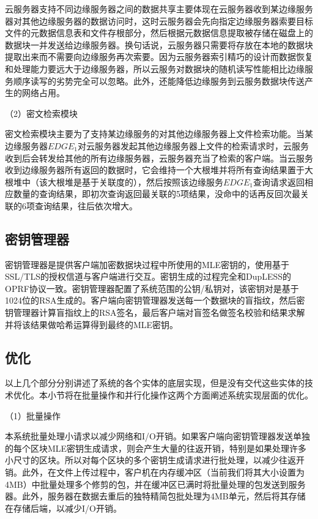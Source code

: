 \documentclass[promaster]{thesis-uestc}
\begin{document}
云服务器支持不同边缘服务器之间的数据共享主要体现在云服务器收到某边缘服务器对其他边缘服务器的数据访问时，这时云服务器会先向指定边缘服务器索要目标文件的元数据信息表和文件存根部分，然后根据元数据信息提取被存储在磁盘上的数据块一并发送给边缘服务器。换句话说，云服务器只需要将存放在本地的数据块提取出来而不需要向边缘服务再次索要。因为云服务器索引精巧的设计而数据恢复和处理能力要远大于边缘服务器，所以云服务对数据块的随机读写性能相比边缘服务顺序读写的劣势完全可以忽略。此外，还能降低边缘服务到云服务数据块传送产生的网络占用。

（2）密文检索模块

密文检索模块主要为了支持某边缘服务的对其他边缘服务器上文件检索功能。当某边缘服务器$EDGE_1$对云服务器发起其他边缘服务器上文件的检索请求时，云服务收到后会转发给其他的所有边缘服务器，云服务器充当了检索的客户端。当云服务收到边缘服务器所有返回的数据时，它会维持一个大根堆并将所有查询结果置于大根堆中（该大根堆是基于关联度的），然后按照该边缘服务$EDGE_1$查询请求返回相应数量的查询结果，即初次查询返回最关联的5项结果，没命中的话再反回次最关联的6项查询结果，往后依次增大。

\subsection{密钥管理器}
密钥管理器是提供客户端加密数据块过程中所使用的MLE密钥的，使用基于SSL/TLS的授权信道与客户端进行交互。密钥生成的过程完全和DupLESS的OPRF协议一致。密钥管理器配置了系统范围的公钥/私钥对，该密钥对是基于1024位的RSA生成的。客户端向密钥管理器发送每一个数据块的盲指纹，然后密钥管理器计算盲指纹上的RSA签名，最后客户端对盲签名做签名校验和结果求解并将该结果做哈希运算得到最终的MLE密钥。

\subsection{优化}
以上几个部分分别讲述了系统的各个实体的底层实现，但是没有交代这些实体的技术优化。本小节将在批量操作和并行化操作这两个方面阐述系统实现层面的优化。

（1）批量操作

本系统批量处理小请求以减少网络和I/O开销。如果客户端向密钥管理器发送单独的每个区块MLE密钥生成请求，则会产生大量的往返开销，特别是如果处理许多小尺寸的区块。所以对每个区块的多个密钥生成请求进行批处理，以减少往返开销。此外，在文件上传过程中，客户机在内存缓冲区（当前我们将其大小设置为4MB）中批量处理多个修剪的包，并在缓冲区已满时将批量处理的包发送到服务器。此外，服务器在数据去重后的独特精简包批处理为4MB单元，然后将其存储在存储后端，以减少I/O开销。
\end{document}
